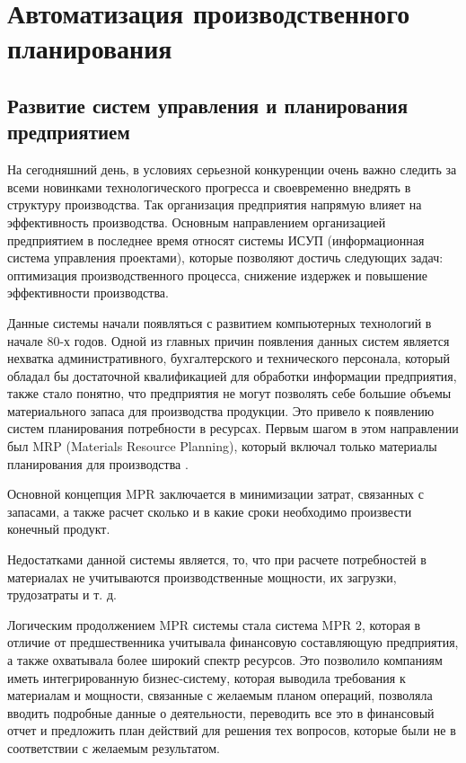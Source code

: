 \chapter{Автоматизация производственного планирования}
\section{Развитие систем управления и планирования предприятием}
На сегодняшний день, в условиях серьезной конкуренции очень важно следить за всеми новинками технологического прогресса и своевременно внедрять в структуру производства. Так организация предприятия напрямую влияет на эффективность производства. Основным направлением организацией предприятием в последнее время относят системы ИСУП (информационная система управления проектами), которые позволяют достичь следующих задач: оптимизация производственного процесса, снижение издержек и повышение эффективности производства.

Данные системы начали появляться с развитием компьютерных технологий в начале 80-х годов. Одной из главных причин появления данных систем является нехватка административного, бухгалтерского и технического персонала, который обладал бы достаточной квалификацией для обработки информации предприятия, также стало понятно, что предприятия не могут позволять себе большие объемы материального запаса для производства продукции. Это привело к появлению систем планирования потребности в ресурсах. Первым шагом в этом направлении был MRP (Materials Resource Planning), который включал только материалы планирования для производства  \cite{MRP}.

Основной концепция MPR заключается в минимизации затрат, связанных с запасами, а также расчет сколько и в какие сроки необходимо произвести конечный продукт.

Недостатками данной системы является, то, что при расчете потребностей в материалах не учитываются производственные мощности, их загрузки, трудозатраты и т. д.

Логическим продолжением MPR системы стала система MPR 2, которая в отличие от предшественника учитывала финансовую составляющую предприятия, а также охватывала более широкий спектр ресурсов. Это позволило компаниям иметь интегрированную бизнес-систему, которая выводила требования к материалам и мощности, связанные с желаемым планом операций, позволяла вводить подробные данные о деятельности, переводить все это в финансовый отчет и предложить план действий для решения тех вопросов, которые были не в соответствии с желаемым результатом.

